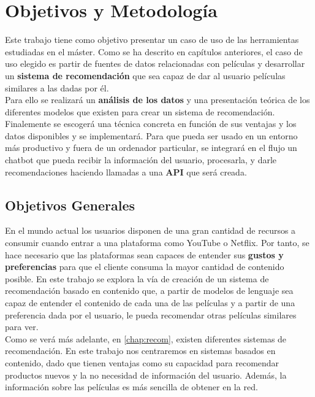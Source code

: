 \chapter{Objetivos y Metodología}\label{chap:objetivos}

Este trabajo tiene como objetivo presentar un caso de uso de las herramientas estudiadas en el máster. Como se ha descrito en capítulos anteriores, el caso de uso elegido es partir de fuentes de datos relacionadas con películas y desarrollar un \textbf{sistema de recomendación} que sea capaz de dar al usuario películas similares a las dadas por él.\\

Para ello se realizará un \textbf{análisis de los datos} y una presentación teórica de los diferentes modelos que existen para crear un sistema de recomendación. Finalemente se escogerá una técnica concreta en función de sus ventajas y los datos disponibles y se implementará. Para que pueda ser usado en un entorno más productivo y fuera de un ordenador particular, se integrará en el flujo un chatbot que pueda recibir la información del usuario, procesarla, y darle recomendaciones haciendo llamadas a una \textbf{API} que será creada.



\section{Objetivos Generales}\label{sec:objgenerales}

En el mundo actual los usuarios disponen de una gran cantidad de recursos a consumir cuando entrar a una plataforma como YouTube o Netflix. Por tanto, se hace necesario que las plataformas sean capaces de entender sus \textbf{gustos y preferencias} para que el cliente consuma la mayor cantidad de contenido posible. En este trabajo se explora la vía de creación de un sistema de recomendación basado en contenido que, a partir de modelos de lenguaje sea capaz de entender el contenido de cada una de las películas y a partir de una preferencia dada por el usuario, le pueda recomendar otras películas similares para ver.\\

Como se verá más adelante, en \ref{chap:recom}, existen diferentes sistemas de recomendación. En este trabajo nos centraremos en sistemas basados en contenido, dado que tienen ventajas como su capacidad para recomendar productos nuevos y la no necesidad de información del usuario. Además, la información sobre las películas es más sencilla de obtener en la red.\\

